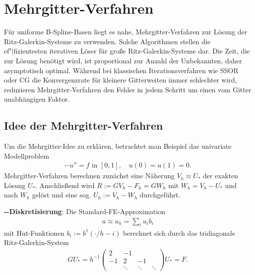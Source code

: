 \section{%
    Mehrgitter-Verfahren%
}

Für uniforme B-Spline-Basen liegt es nahe, Mehrgitter-Verfahren zur Lösung der
Ritz-Galerkin-Systeme zu verwenden.
Solche Algorithmen stellen die ef"|fizientesten iterativen Löser für große
Ritz-Galerkin-Systeme dar.
Die Zeit, die zur Lösung benötigt wird, ist proportional zur Anzahl der Unbekannten,
daher asymptotisch optimal.
Während bei klassischen Iterationsverfahren wie SSOR oder CG die Konvergenzrate
für kleinere Gitterweiten immer schlechter wird,
reduzieren Mehrgitter-Verfahren den Fehler in jedem Schritt um einen vom Gitter unabhängigen
Faktor.

\subsection{%
    Idee der Mehrgitter-Verfahren%
}

Um die Mehrgitter-Idee zu erklären, betrachtet man Beispiel das univariate Modellproblem
\begin{align*}
    -u'' = f \text{ in } [0, 1],\quad
    u(0) = u(1) = 0.
\end{align*}
Mehrgitter-Verfahren berechnen zunächst eine Näherung $V_h \approx U_\ast$ der exakten Lösung
$U_\ast$.
Anschließend wird $R := GV_h - F_h = GW_h$ mit $W_h = V_h - U_\ast$ und  nach $W_h$ gelöst
und eine sog.  $U_h := V_h - W_h$ durchgeführt.

\linie

\textbf{--Diskretisierung}:
Die Standard-FE-Approximation
\begin{align*}
    u \approx u_h = \sum_i u_i b_i
\end{align*}
mit Hut-Funktionen $b_i := b^1(\cdot/h - i)$ berechnet sich durch das tridiagonale
Ritz-Galerkin-System
\begin{align*}
    GU_\ast = h^{-1} \begin{pmatrix}2 & -1 & &\\-1 & 2 & -1 & \\ & \ddots & \ddots & \ddots
    \end{pmatrix} U_\ast = F.
\end{align*}

\linie

